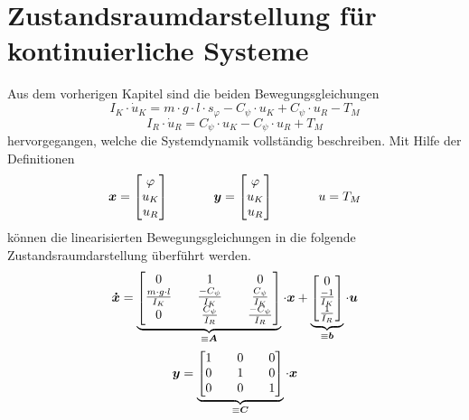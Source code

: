 \section{Zustandsraumdarstellung für kontinuierliche Systeme}
Aus dem vorherigen Kapitel sind die beiden Bewegungsgleichungen 
\begin{equation}
I_K \cdot \dot{u}_K = m\cdot g\cdot l\cdot s_{\varphi} - C_{\psi}\cdot u_{K} + C_{\psi} \cdot u_{R} - T_M
\end{equation}
\begin{equation}
I_R\cdot \dot{u}_R = C_{\psi}\cdot u_{K} - C_{\psi}\cdot u_{R} + T_M
\end{equation}
hervorgegangen, welche die Systemdynamik vollständig beschreiben. Mit Hilfe der Definitionen
\begin{equation}
\boldsymbol{x} = \begin{bmatrix} \varphi \\ u_K \\ u_R \end{bmatrix}
\hspace{35pt}
\boldsymbol{y} = \begin{bmatrix} \varphi \\ u_K \\ u_R \end{bmatrix}
\hspace{35pt}
u = T_M
\end{equation}
können die linearisierten Bewegungsgleichungen in die folgende Zustandsraumdarstellung überführt werden.
\begin{equation}
\boldsymbol{\dot{x}} = \underbrace{\begin{bmatrix}
0 && 1 && 0 
\\ 
\frac{m\cdot g\cdot l}{I_K} && \frac{-C_{\psi}}{I_K} && \frac{C_{\psi}}{I_K}
\\
0 && \frac{C_{\psi}}{I_R} && \frac{-C_{\psi}}{I_R}
\end{bmatrix}}_{\equiv \boldsymbol{A}} \cdot \boldsymbol{x}
+
\underbrace{\begin{bmatrix}
0 \\ \frac{-1}{I_K} \\ \frac{1}{I_R}
\end{bmatrix}}_{\equiv \boldsymbol{b}} \cdot \boldsymbol{u}
\end{equation}
\begin{equation}
\boldsymbol{y} = \underbrace{\begin{bmatrix}
1 && 0 && 0 \\ 0 && 1 && 0 \\ 0 && 0 && 1
\end{bmatrix}}_{\equiv \boldsymbol{C}} \cdot \boldsymbol{x}
\end{equation}
